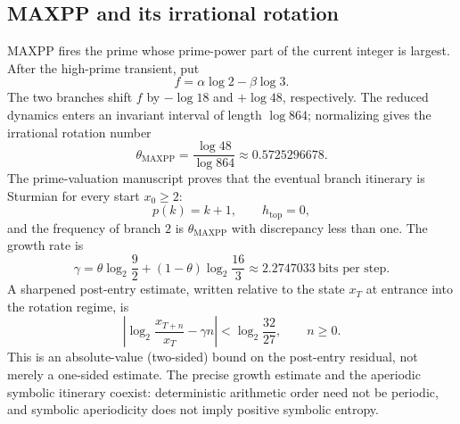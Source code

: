 \documentclass[11pt,a4paper]{article}
\theoremstyle{definition}\newtheorem{definition}[theorem]{Definition}
\begin{document}
\subsection{MAXPP and its irrational rotation}
MAXPP fires the prime whose prime-power part of the current integer is largest. After the high-prime transient, put
\begin{equation}\label{eq:f}
f=\alpha\log2-\beta\log3.
\end{equation}
The two branches shift $f$ by $-\log18$ and $+\log48$, respectively. The reduced dynamics enters an invariant interval of length $\log864$; normalizing gives the irrational rotation number
\begin{equation}\label{eq:theta}
\boxed{\theta_{\mathrm{MAXPP}}=\frac{\log48}{\log864}\approx0.5725296678.}
\end{equation}
The prime-valuation manuscript proves that the eventual branch itinerary is Sturmian for every start $x_0\ge2$:
\begin{equation}\label{eq:sturmian}
p(k)=k+1,\qquad h_{\mathrm{top}}=0,
\end{equation}
and the frequency of branch $2$ is $\theta_{\mathrm{MAXPP}}$ with discrepancy less than one. The growth rate is
\begin{equation}\label{eq:gamma}
\gamma=\theta\log_2\frac92+(1-\theta)\log_2\frac{16}{3}
\approx2.2747033\ \text{bits per step}.
\end{equation}
A sharpened post-entry estimate, written relative to the state $x_T$ at entrance into the rotation regime, is
\begin{equation}\label{eq:deviation}
\left|\log_2\frac{x_{T+n}}{x_T}-\gamma n\right|
<\log_2\frac{32}{27},\qquad n\ge0.
\end{equation}
This is an absolute-value (two-sided) bound on the post-entry residual, not merely a one-sided estimate.
The precise growth estimate and the aperiodic symbolic itinerary coexist: deterministic arithmetic order need not be periodic, and symbolic aperiodicity does not imply positive symbolic entropy.
\end{document}
